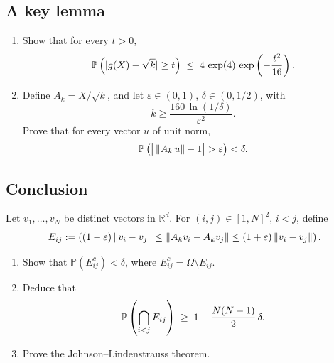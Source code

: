 \documentclass[a4paper]{report}
\begin{document}
\subsection{A key lemma}
\begin{enumerate}
\item Show that for every \(t>0\),
  \[
    \mathbb{P}\left ( |g(X)-\sqrt{k}|\ge t \right )
    \;\le\;
    4\,\exp(4)\,\exp\left ( -\frac{t^2}{16} \right ).
  \]
\item Define \(A_k=X/\sqrt k\), and let \(\varepsilon\in(0,1)\), \(\delta\in(0,1/2)\), with
  \[
    k \ge \frac{160\,\ln(1/\delta)}{\varepsilon^2}.
  \]
Prove that for every vector \(u\)
of unit norm,
  \[
    \mathbb{P}\left ( \big|\,\|A_k\,u\|-1\big| > \varepsilon \right ) < \delta.
  \]
\end{enumerate}

\subsection{Conclusion}
Let $v_1,\ldots,v_N$ be distinct vectors in $\mathbb R^d$. For \((i,j)\in[1,N]^2\), \(i<j\), define
\[
  E_{ij}
  := \lbrb{%
    (1-\varepsilon)\,\|v_i-v_j\|\le\|A_kv_i-A_kv_j\|\le(1+\varepsilon)\,\|v_i-v_j\|%
  }.
\]
\begin{enumerate}
\item Show that \(\mathbb P(E_{ij}^c)<\delta\), where \(E_{ij}^c=\Omega\setminus E_{ij}\).
\item Deduce that
  \[
\mathbb{P}\left ( \bigcap_{i<j}E_{ij} \right )
    \;\ge\;
    1 - \frac{N(N-1)}{2}\,\delta.
  \]
\item Prove the Johnson--Lindenstrauss theorem.
\end{enumerate}
\end{document}
